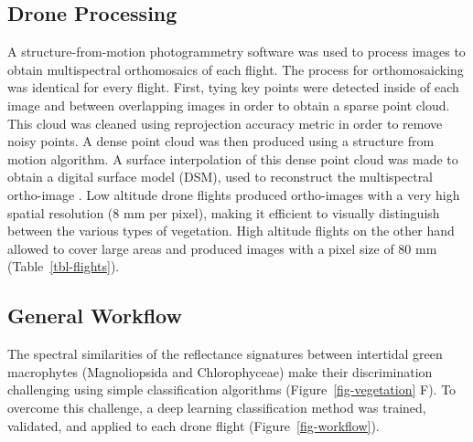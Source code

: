 \documentclass[
  number]{elsarticle}
\begin{document}
\subsection{Drone Processing}\label{drone-processing}

A structure-from-motion photogrammetry software \citep[Agisoft
Metashape,][]{agisoft}was used to process images to obtain multispectral
orthomosaics of each flight. The process for orthomosaicking was
identical for every flight. First, tying key points were detected inside
of each image and between overlapping images in order to obtain a sparse
point cloud. This cloud was cleaned using reprojection accuracy metric
in order to remove noisy points. A dense point cloud was then produced
using a structure from motion algorithm. A surface interpolation of this
dense point cloud was made to obtain a digital surface model (DSM), used
to reconstruct the multispectral ortho-image \citep{nebel2020review}.
Low altitude drone flights produced ortho-images with a very high
spatial resolution (8 mm per pixel), making it efficient to visually
distinguish between the various types of vegetation. High altitude
flights on the other hand allowed to cover large areas and produced
images with a pixel size of 80 mm (Table~\ref{tbl-flights}).

\subsection{General Workflow}\label{general-workflow}

The spectral similarities of the reflectance signatures between
intertidal green macrophytes (Magnoliopsida and Chlorophyceae) make
their discrimination challenging using simple classification algorithms
(Figure~\ref{fig-vegetation} F). To overcome this challenge, a deep
learning classification method was trained, validated, and applied to
each drone flight (Figure~\ref{fig-workflow}).
\end{document}
